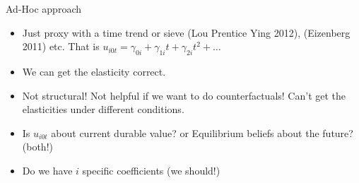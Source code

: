 \documentclass[xcolor=pdftex,dvipsnames,table,mathserif,aspectratio=169]{beamer}
\begin{document}
\begin{frame}{Ad-Hoc approach}
\begin{itemize}
\item  Just proxy with a time trend or sieve (Lou Prentice Ying 2012), (Eizenberg 2011) etc.  That is $u_{i0t} = \gamma_{0i} + \gamma_{1i} t + \gamma_{2i} t^2 + \ldots$
\item We can get the elasticity correct.
\item Not structural! Not helpful if we want to do counterfactuals! Can't get the elasticities under different conditions.
\item Is $u_{i0t}$ about current durable value? or Equilibrium beliefs about the future? (both!)
\item Do we have $i$ specific coefficients (we should!)
\end{itemize}
\end{frame}
\end{document}
